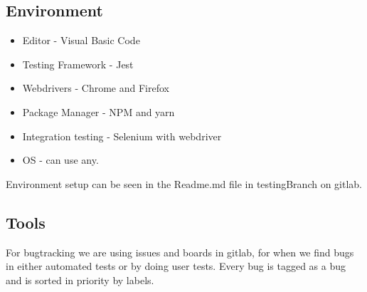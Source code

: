 \subsection{Environment}
\begin{itemize}
    \item Editor - Visual Basic Code
    \item Testing Framework - Jest
    \item Webdrivers - Chrome and Firefox
    \item Package Manager - NPM and yarn
    \item Integration testing - Selenium with webdriver
    \item OS - can use any.
\end{itemize}

Environment setup can be seen in the Readme.md file in testingBranch on gitlab. 

\subsection{Tools}
For bugtracking we are using issues and boards in gitlab, for when we find bugs in either automated tests or by doing user tests. Every bug is tagged as a bug and is sorted in priority by labels. 
